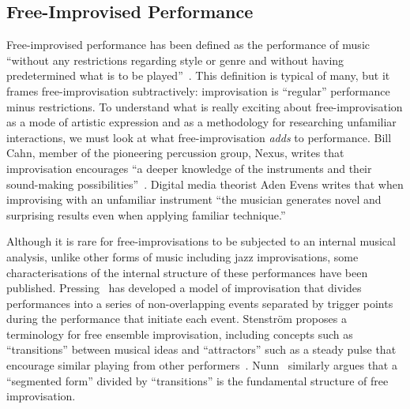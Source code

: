 \documentclass[graybox]{svmult}
\begin{document}



\subsection{Free-Improvised Performance}
\label{subsec:free-improvisation}

Free-improvised performance has been defined as the performance of
music ``without any restrictions regarding style or genre and without
having predetermined what is to be played''~\cite{Stenstrom:2009xy}.
This definition is typical of many, but it frames
free-improvisation subtractively: improvisation is ``regular''
performance minus restrictions. To understand what is really exciting
about free-improvisation as a mode of artistic expression and as a
methodology for researching unfamiliar interactions, we must look at
what free-improvisation \emph{adds} to performance. Bill Cahn, member
of the pioneering percussion group, Nexus, writes that improvisation
encourages ``a deeper knowledge of the instruments and their
sound-making possibilities''~\cite{Cahn:2005uq}. Digital media
theorist Aden Evens writes that when improvising with an unfamiliar
instrument ``the musician generates novel and surprising results even
when applying familiar technique.''~\cite{Evens:2005kx}

Although it is rare for free-improvisations to be subjected to an
internal musical analysis, unlike other forms of music including jazz
improvisations, some characterisations of the internal structure of
these performances have been published.
Pressing~\cite{Pressing:1988uo} has developed a model of improvisation
that divides performances into a series of non-overlapping events
separated by trigger points during the performance that initiate each
event. Stenstr\"om proposes a terminology for free ensemble
improvisation, including concepts such as ``transitions'' between
musical ideas and ``attractors'' such as a steady pulse that encourage
similar playing from other performers~\cite{Stenstrom:2009xy}.
Nunn~\cite{Nunn:1998ly} similarly argues that a ``segmented form''
divided by ``transitions'' is the fundamental structure of free
improvisation.
\end{document}
